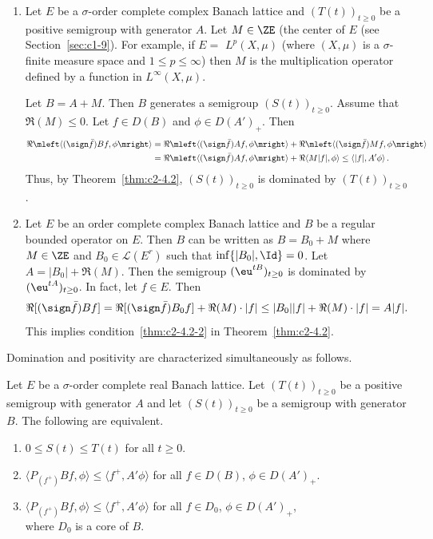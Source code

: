 \begin{example}\label{ex:c2-4.4} 
\begin{enumerate}[\upshape (i), wide, labelindent=.25em] %
\item \label{ex:c2-4.4-1}
Let $E$ be a $\sigma$-order complete complex Banach lattice and $(T(t))_{t \geq 0}$ be a positive semigroup with generator $A$. 
Let $M \in \ZE$ (the center of\/ $E$ (see Section~\ref{sec:c1-9}). 
For example, if\/ $E =$ $L^{p}(X,\mu)$ (where $(X,\mu)$ is a $\sigma$-finite measure space and $1 \leq p \leq \infty$) then $M$ is the multiplication operator defined by a function in $L^{\infty}(X,\mu)$.

Let $B = A + M$. Then $B$ generates a semigroup $(S(t))_{t \geq 0}$.
Assume that $\Re(M) \leq 0$. Let $f \in D(B)$ and $\phi \in D(A')_{+}$. Then
\begin{align*}
\Re\mleft\langle(\sign  \bar{f})Bf,\phi\mright\rangle &= \Re\mleft\langle(\sign  \bar{f})Af,\phi\mright\rangle + \Re\mleft\langle(\sign  \bar{f})Mf,\phi\mright\rangle\\
&= \Re\mleft\langle(\sign  \bar{f})Af,\phi\mright\rangle + \Re\langle M|f|,\phi\rangle 
\leq \langle|f|,A'\phi\rangle\,.
\end{align*}
Thus, by Theorem~\ref{thm:c2-4.2}, $(S(t))_{t \geq 0}$ is dominated by $(T(t))_{t \geq 0}$.
\item \label{ex:c2-4.4-2}
Let $E$ be an order complete complex Banach lattice and $B$ be a regular bounded operator on $E$. 
Then $B$ can be written as $B = B_{0} + M$ where $M \in \ZE$ and $B_{0} \in \mathcal{L}(E^{r})$ 
such that $\inf \{|B_{0}|, \Id\} = 0$.
Let $A = |B_{0}| + \Re(M)$. 
Then the semigroup $(\eu^{tB})_{t \geq 0}$ is dominated by $(\eu^{tA})_{t \geq 0}$. 
In fact, let $f \in E$. 
Then 
%
\[
	\Re[(\sign  \bar{f})Bf] = \Re[(\sign \bar{f})B_{0}f] + \Re(M) \cdot |f| \leq |B_{0}||f| + \Re(M) 
		\cdot |f| = A|f| .
\]
%
This implies condition~\ref{thm:c2-4.2-2} in Theorem~\ref{thm:c2-4.2}.
\end{enumerate}
\end{example}
Domination and positivity are characterized simultaneously as
follows.
\begin{proposition}\label{prop:c2-4.5}
Let $E$ be a $\sigma$-order complete real Banach lattice.
Let $(T(t))_{t \geq 0}$ be a positive semigroup with generator $A$ and let
$(S(t))_{t \geq 0}$ be a semigroup with generator $B$. The following are equivalent.
\begin{enumerate}[\upshape (a)]
\item \label{prop:c2-4.5-1}
$0 \leq S(t) \leq T(t)$ for all $t \geq 0$.
\item \label{prop:c2-4.5-2}
$\langle P_{(f^{+})}Bf,\phi\rangle \leq \langle f^{+},A'\phi\rangle$ for all $f \in D(B)$, $\phi \in D(A')_{+}$.
\item \label{prop:c2-4.5-3}
$\langle P_{(f^{+})}Bf,\phi\rangle \leq \langle f^{+},A'\phi\rangle$ for all $f \in D_{0}$, $\phi \in D(A')_{+}$,\\
where $D_{0}$ is a core of\/ $B$.
\end{enumerate}
\end{proposition}
